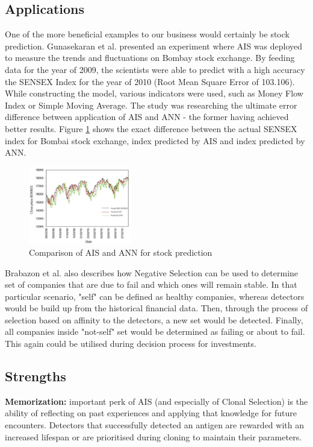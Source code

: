 \documentclass[letterpaper, 10 pt, conference]{ieeeconf}  %
\begin{document}
\subsection{Applications}
One of the more beneficial examples to our business would certainly be stock prediction. Gunasekaran et al. \cite{gunasekaran2011evaluation} presented an experiment where AIS was deployed to measure the trends and fluctuations on Bombay stock exchange. By feeding data for the year of 2009, the scientists were able to predict with a high accuracy the SENSEX Index for the year of 2010 (Root Mean Square Error of 103.106). While constructing the model, various indicators were used, such as Money Flow Index or Simple Moving Average. The study was researching the ultimate error difference between application of AIS and ANN - the former having achieved better results. Figure \ref{fig:stock} shows the exact difference between the actual SENSEX index for Bombai stock exchange, index predicted by AIS and index predicted by ANN. \newline
\begin{figure}[h!]
  \centering
  \includegraphics[width=0.4\textwidth]{graph}
  \caption{Comparison of AIS and ANN for stock prediction \cite{gunasekaran2011evaluation}}
  \label{fig:stock}
\end{figure}
Brabazon et al. \cite{brabazon2006biologically} also describes how Negative Selection can be used to determine set of companies that are due to fail and which ones will remain stable. In that particular scenario, "self" can be defined as healthy companies, whereas detectors would be build up from the historical financial data. Then, through the process of selection based on affinity to the detectors, a new set would be detected. Finally, all companies inside "not-self" set would be determined as failing or about to fail. This again could be utilised during decision process for investments. 


\subsection{Strengths} 
\textbf{Memorization:} important perk of AIS (and especially of Clonal Selection) is the ability of reflecting on past experiences and applying that knowledge for future encounters. \cite{timmis2004overview} Detectors that successfully detected an antigen are rewarded with an increased lifespan or are prioritised during cloning to maintain their parameters. 
\end{document}
